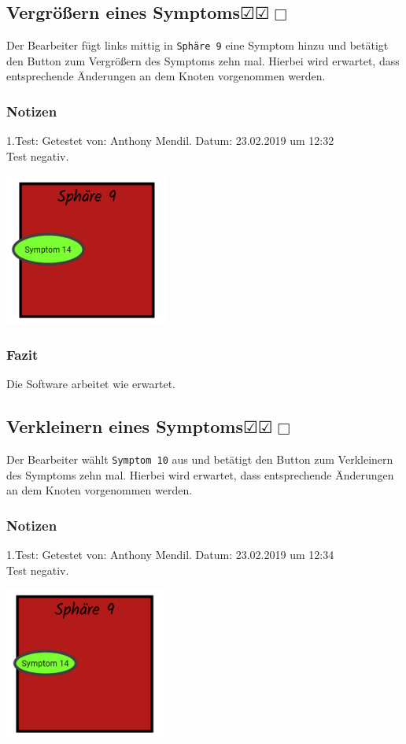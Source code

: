 \documentclass{scrartcl}
\newcommand{\subsectiont}[2]{\subsection[#1]{#1{\normalsize\normalfont #2}}}
\newcommand{\leer}{$\Box$}
\newcommand{\ok}{$\CheckedBox$}
\begin{document}
\subsectiont{Vergrößern eines Symptoms}{\dotfill\ok\ok\leer}
Der Bearbeiter fügt links mittig in \texttt{Sphäre 9} eine Symptom hinzu und betätigt den Button zum Vergrößern des Symptoms zehn mal. Hierbei wird erwartet, dass entsprechende Änderungen an dem Knoten vorgenommen werden.
\subsubsection{Notizen}
1.Test: Getestet von: Anthony Mendil. Datum: 23.02.2019 um 12:32 \\
Test negativ.
\begin{center}
\includegraphics[height=5cm]{2_23.PNG}
\end{center}
\subsubsection{Fazit}
Die Software arbeitet wie erwartet.

\subsectiont{Verkleinern eines Symptoms}{\dotfill\ok\ok\leer}
Der Bearbeiter wählt \texttt{Symptom 10} aus und betätigt den Button zum Verkleinern des Symptoms zehn mal. Hierbei wird erwartet, dass entsprechende Änderungen an dem Knoten vorgenommen werden.
\subsubsection{Notizen}
1.Test: Getestet von: Anthony Mendil. Datum: 23.02.2019 um 12:34 \\
Test negativ.
\begin{center}
\includegraphics[height=5cm]{2_24.PNG}
\end{center}
\end{document}
